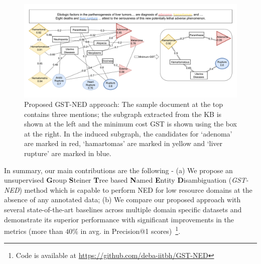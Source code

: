 \documentclass[11pt]{article}
\begin{document}

\begin{figure}
\includegraphics[width=\linewidth]{./pix/pipeline_m4.pdf}
\caption{Proposed GST-NED approach: The sample document at the top contains three mentions; the subgraph extracted from the KB is shown at the left and the minimum cost GST is shown using the box at the right. In the induced subgraph, the candidates for `adenoma' are marked in red, `hamartomas' are marked in yellow and `liver rupture' are marked in blue.}
\label{fig:el-task}
\end{figure}


In summary, our main contributions are the following -
(a) We propose an unsupervised \textbf{G}roup \textbf{S}teiner \textbf{T}ree based \textbf{N}amed \textbf{E}ntity \textbf{D}isambiguation (\emph{GST-NED}) method which is capable to perform NED for low resource domains at the absence of any annotated data;
(b) We compare our proposed approach with several state-of-the-art baselines across multiple domain specific datasets and demonstrate its superior performance
with significant improvements in the metrics (more than $40\%$ in avg. in Precision@1 scores)~\footnote{Code is available at \url{https://github.com/deba-iitbh/GST-NED}}. 
\end{document}
